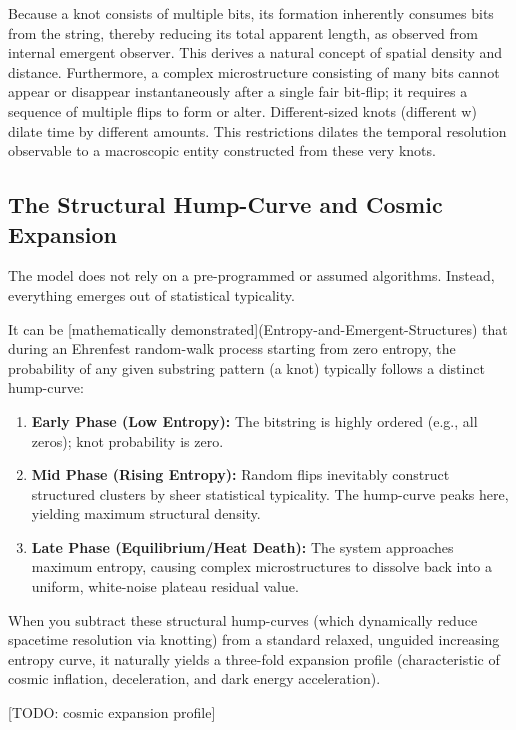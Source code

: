 Because a knot consists of multiple bits, its formation inherently consumes bits from the string,
thereby reducing its total  apparent length, as observed from internal emergent observer.
This derives a natural concept of spatial density and distance. Furthermore, a complex microstructure consisting of many bits
cannot appear or disappear instantaneously after a single fair bit-flip; it requires a sequence of multiple flips to form or alter.
Different-sized knots (different w) dilate time by different amounts.
This restrictions dilates the temporal resolution observable to a macroscopic entity constructed from these very knots.



\subsection{The Structural Hump-Curve and Cosmic Expansion}

The model does not rely on a pre-programmed or assumed algorithms. Instead, everything emerges out of statistical typicality.

It can be [mathematically demonstrated](Entropy-and-Emergent-Structures) that during an Ehrenfest random-walk process starting from zero entropy, the probability of any given substring pattern (a knot) typically follows a distinct hump-curve:

\begin{enumerate}
\item \textbf{Early Phase (Low Entropy):} The bitstring is highly ordered (e.g., all zeros); knot probability is zero.
\item \textbf{Mid Phase (Rising Entropy):} Random flips inevitably construct structured clusters by sheer statistical typicality. The hump-curve peaks here, yielding maximum structural density.
\item \textbf{Late Phase (Equilibrium/Heat Death):} The system approaches maximum entropy, causing complex microstructures to dissolve back into a uniform, white-noise plateau residual value.
\end{enumerate}

When you subtract these structural hump-curves (which dynamically reduce spacetime resolution via knotting) from a standard relaxed, unguided increasing entropy curve, it naturally yields a three-fold expansion profile (characteristic of cosmic inflation, deceleration, and dark energy acceleration).

[TODO: cosmic expansion profile]


